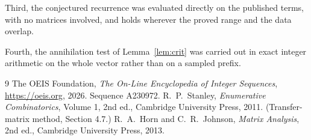 \documentclass[11pt,a4paper]{article}
\theoremstyle{plain}
\theoremstyle{definition}
\begin{document}
Third, the conjectured recurrence was evaluated directly on the published terms, with no
matrices involved, and holds wherever the proved range and the data overlap.

Fourth, the annihilation test of Lemma~\ref{lem:crit} was carried out in exact integer
arithmetic on the whole vector rather than on a sampled prefix.

\begin{thebibliography}{9}
 The OEIS Foundation, \emph{The On-Line Encyclopedia of Integer
Sequences}, \url{https://oeis.org}, 2026. Sequence A230972.
 R.~P.~Stanley, \emph{Enumerative Combinatorics}, Volume 1, 2nd ed.,
Cambridge University Press, 2011. (Transfer-matrix method, Section 4.7.)
 R.~A.~Horn and C.~R.~Johnson, \emph{Matrix Analysis}, 2nd ed., Cambridge
University Press, 2013.
\end{thebibliography}
\end{document}
